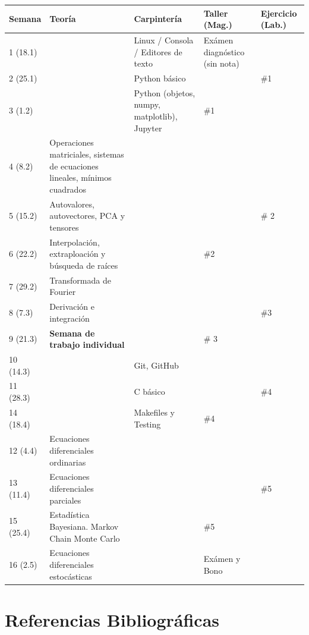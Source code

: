 \documentclass[11pt]{article}
\begin{document}
\begin{center}
\renewcommand{\arraystretch}{1.1}
\begin{tabular}{|p{1.6cm}|p{4.5cm}|p{4.50cm}|p{2.0cm}|p{2.0cm}|}
\hline
Semana & Teor\'ia & Carpinter\'ia & Taller (Mag.) & Ejercicio (Lab.) \\\hline
1 (18.1) &     & Linux / Consola / Editores de texto &  Ex\'amen
diagn\'ostico (sin nota) & \\\hline
2 (25.1) & 	& Python b\'asico & & \#1 \\\hline
3 (1.2) & 	& Python (objetos, numpy, matplotlib), Jupyter& \#1 & \\\hline 
4 (8.2) & 	Operaciones matriciales, sistemas de ecuaciones lineales,
m\'inimos cuadrados & &  & \\\hline
5 (15.2) &  Autovalores, autovectores, PCA y tensores& & & \# 2 \\\hline
6 (22.2) &  Interpolaci\'on, extraploaci\'on y b\'usqueda de ra\'ices
& & \#2 & \\\hline
7 (29.2) &  Transformada de Fourier & & & \\ \hline
8 (7.3) & Derivaci\'on e integraci\'on &  &  & \#3 \\\hline
9 (21.3) & {\bf Semana de trabajo individual} & & \# 3&\\\hline
10 (14.3) & & Git, GitHub &  & \\\hline
11 (28.3) & & C b\'asico & & \#4 \\\hline
14 (18.4) & & Makefiles y Testing & \#4& \\\hline
12 (4.4) & Ecuaciones diferenciales ordinarias & & & \\\hline 
13 (11.4) & Ecuaciones diferenciales parciales & & & \#5 \\\hline
15 (25.4) & Estad\'istica Bayesiana. Markov Chain Monte Carlo &   &
\#5  & \\\hline 
16 (2.5) & Ecuaciones diferenciales estoc\'asticas &   & Ex\'amen y
Bono &\\\hline 
\end{tabular}
\end{center}

\newpage

\section*{Referencias Bibliogr\'aficas}
\end{document}
